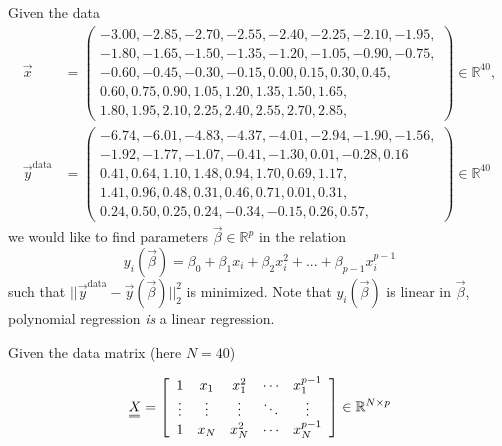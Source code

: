     Given the data
    \begin{equation}
    \begin{aligned}
    \vec{x} &=
    \begin{pmatrix}
    -3.00,-2.85,-2.70,-2.55,-2.40,-2.25,-2.10,-1.95, \\
    -1.80,-1.65,-1.50,-1.35,-1.20,-1.05,-0.90,-0.75, \\
    -0.60,-0.45,-0.30,-0.15,0.00,0.15,0.30,0.45, \\
    0.60,0.75,0.90,1.05,1.20,1.35,1.50,1.65, \\
    1.80,1.95,2.10,2.25,2.40,2.55,2.70,2.85,
    \end{pmatrix} \in \mathbb{R}^{40},
    \\[1ex]
    \vec{y}^{\text{data}} &=
    \begin{pmatrix}
    -6.74,-6.01,-4.83,-4.37,-4.01,-2.94,-1.90,-1.56, \\
    -1.92,-1.77,-1.07,-0.41,-1.30,0.01,-0.28,0.16 \\
    0.41,0.64,1.10,1.48,0.94,1.70,0.69,1.17, \\
    1.41,0.96,0.48,0.31,0.46,0.71,0.01,0.31, \\
    0.24,0.50,0.25,0.24,-0.34,-0.15,0.26,0.57,
    \end{pmatrix}  \in \mathbb{R}^{40}
    \end{aligned}
    \end{equation}
    we would like to find parameters $\vec{\beta} \in \mathbb{R}^p$ in the relation
    \begin{equation}
        y_i(\vec{\beta}) = \beta_0 + \beta_1 x_i + \beta_2 x_i^2 + ... + \beta_{p-1} x_i^{p-1}
    \end{equation}
    such that $||\vec{y}^{\text{data}} - \vec{y}(\vec{\beta})||_2^2$ is minimized. Note 
    that $y_i(\vec{\beta})$ is linear in $\vec{\beta}$, polynomial regression \textit{is}
    a linear regression.

    Given the data matrix (here $N = 40$)

    \begin{equation}
        \mat{X} = \left[\begin{array}{ccccc}
        1 & x_{1} & x_{1}^2 & \cdots & x_{1}^{p-1} \\
        \vdots & \vdots & \vdots & \ddots & \vdots \\
        1 & x_{N} & x_{N}^2 & \cdots & x_{N}^{p-1}
    \end{array}\right] \in \mathbb{R}^{N \times p}
    \end{equation}


